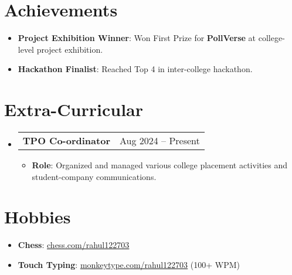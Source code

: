 \documentclass[letterpaper,10pt]{article}
\makeatletter
\newcommand{\resumeItem}[2]{
  \item\small{
    \textbf{#1}{: #2 \vspace{-2pt}}
  }
}
\newcommand{\resumeSubheading}[2]{
  \vspace{-1pt}\item
    \begin{tabular*}{0.97\textwidth}{l@{\extracolsep{\fill}}r}
      \textbf{#1} & #2 \\
    \end{tabular*}\vspace{-4pt}
}
\newcommand{\resumeSubHeadingListStart}{\begin{itemize}[leftmargin=*]}
\newcommand{\resumeSubHeadingListEnd}{\end{itemize}}
\newcommand{\resumeItemListStart}{\begin{itemize}}
\newcommand{\resumeItemListEnd}{\end{itemize}\vspace{-4pt}}
\makeatother
\begin{document}
\section{Achievements}
\resumeSubHeadingListStart
  \resumeItem{Project Exhibition Winner}{Won First Prize for \textbf{PollVerse} at college-level project exhibition.}
  \resumeItem{Hackathon Finalist}{Reached Top 4 in inter-college hackathon.}
\resumeSubHeadingListEnd


\section{Extra-Curricular}
\resumeSubHeadingListStart
  \resumeSubheading{TPO Co-ordinator}{Aug 2024 -- Present}
    \resumeItemListStart
      \resumeItem{Role}{Organized and managed various college placement activities and student-company communications.}
    \resumeItemListEnd
\resumeSubHeadingListEnd

\section{Hobbies}
\resumeSubHeadingListStart
  \resumeItem{Chess}{\href{https://www.chess.com/member/rahul122703}{\faChess \hspace{0.1cm} \underline{chess.com/rahul122703}}}
  \resumeItem{Touch Typing}{\href{https://monkeytype.com/profile/rahul122703}{\faKeyboardO \hspace{0.1cm} \underline{monkeytype.com/rahul122703}} (100+ WPM)}
\resumeSubHeadingListEnd
\end{document}
